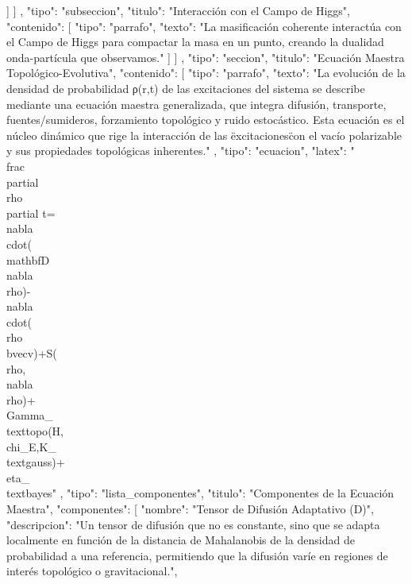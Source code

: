\documentclass{article}
\begin{document}
{{{{              ]
            }
          ]
        },
        {
          "tipo": "subseccion",
          "titulo": "Interacción con el Campo de Higgs",
          "contenido": [
            {
              "tipo": "parrafo",
              "texto": "La masificación coherente interactúa con el Campo de Higgs para compactar la masa en un punto, creando la dualidad onda-partícula que observamos."
            }
          ]
        }
      ]
    },
    {
      "tipo": "seccion",
      "titulo": "Ecuación Maestra Topológico-Evolutiva",
      "contenido": [
        {
          "tipo": "parrafo",
          "texto": "La evolución de la densidad de probabilidad ρ(r,t) de las excitaciones del sistema se describe mediante una ecuación maestra generalizada, que integra difusión, transporte, fuentes/sumideros, forzamiento topológico y ruido estocástico. Esta ecuación es el núcleo dinámico que rige la interacción de las \"excitaciones\" con el vacío polarizable y sus propiedades topológicas inherentes."
        },
        {
          "tipo": "ecuacion",
          "latex": "\\frac{\\partial\\rho}{\\partial t}=\\nabla\\cdot(\\mathbf{D}\\nabla\\rho)-\\nabla\\cdot(\\rho\\bvec{v})+S(\\rho,\\nabla\\rho)+\\Gamma_{\\text{topo}}(H,\\chi_E,K_{\\text{gauss}})+\\eta_{\\text{bayes}}"
        },
        {
          "tipo": "lista_componentes",
          "titulo": "Componentes de la Ecuación Maestra",
          "componentes": [
            {
              "nombre": "Tensor de Difusión Adaptativo (D)",
              "descripcion": "Un tensor de difusión que no es constante, sino que se adapta localmente en función de la distancia de Mahalanobis de la densidad de probabilidad a una referencia, permitiendo que la difusión varíe en regiones de interés topológico o gravitacional.",
}}}}
\end{document}
